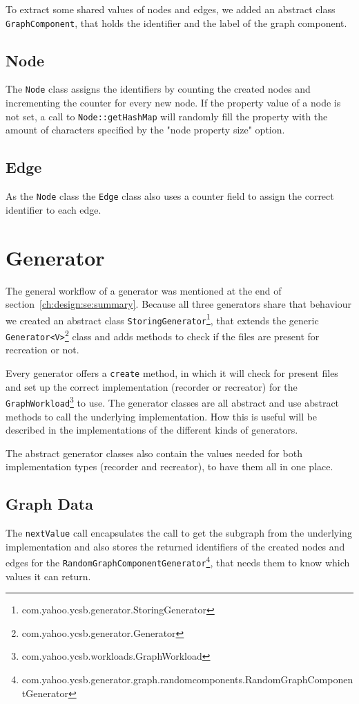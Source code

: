 To extract some shared values of nodes and edges,
we added an abstract class \texttt{GraphComponent},
that holds the identifier and the label of the graph component.

\subsection{Node}
The \texttt{Node} class assigns the identifiers by counting the created nodes and incrementing the counter for every new node.
If the property value of a node is not set,
a call to \texttt{Node::getHashMap} will randomly fill the property with the amount of characters specified by the "node property size" option.

\subsection{Edge}
As the \texttt{Node} class the \texttt{Edge} class also uses a counter field to assign the correct identifier to each edge.

\section{Generator}
\label{ch:implementation:se:generator}
The general workflow of a generator was mentioned at the end of section~\ref{ch:design:se:summary}.
Because all three generators share that behaviour we created an abstract class \texttt{StoringGenerator}\footnote{com.yahoo.ycsb.generator.StoringGenerator},
that extends the generic \texttt{Generator<V>}\footnote{com.yahoo.ycsb.generator.Generator} class and adds methods to check if the files are present for recreation or not.

Every generator offers a \texttt{create} method,
in which it will check for present files and set up the correct implementation (recorder or recreator) for the \texttt{GraphWorkload}\footnote{com.yahoo.ycsb.workloads.GraphWorkload} to use.
The generator classes are all abstract and use abstract methods to call the underlying implementation.
How this is useful will be described in the implementations of the different kinds of generators.

The abstract generator classes also contain the values needed for both implementation types (recorder and recreator),
to have them all in one place.

\subsection{Graph Data}
The \texttt{nextValue} call encapsulates the call to get the subgraph from the underlying implementation and also stores the returned identifiers of the created nodes and edges for the \texttt{RandomGraphComponentGenerator}\footnote{com.yahoo.ycsb.generator.graph.randomcomponents.RandomGraphComponentGenerator},
that needs them to know which values it can return.

